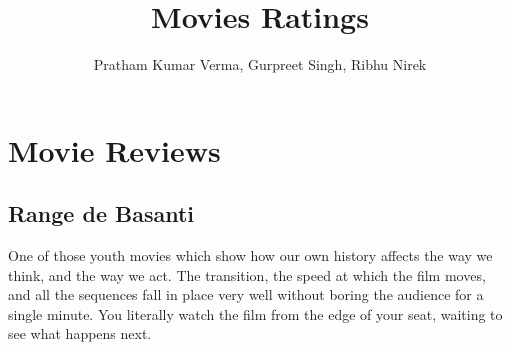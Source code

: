 \documentclass{article}
\title{Movies Ratings}
\author{Pratham Kumar Verma, Gurpreet Singh, Ribhu Nirek}
\date{}
\begin{document}
\maketitle

\section*{Movie Reviews}

	\subsection*{Range de Basanti}

		One of those youth movies which show how our own history affects the way we think, and the way we act. The transition, the speed at which the film moves, and all the sequences fall in place very well without boring the audience for a single minute. You literally watch the film from the edge of your seat, waiting to see what happens next.
\end{document}
